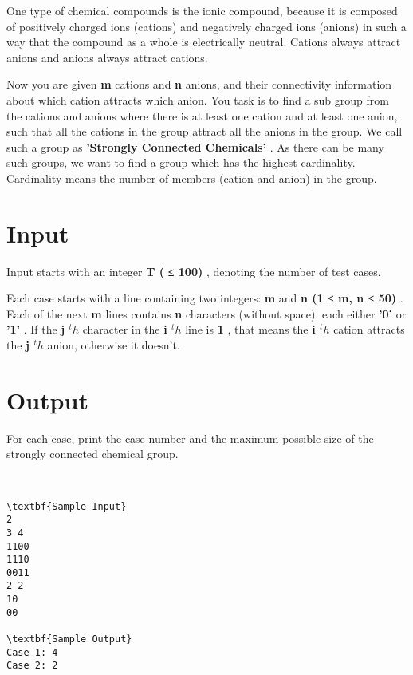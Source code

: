 

One type of chemical compounds is the ionic compound, because it is composed of positively charged ions (cations) and negatively charged ions (anions) in such a way that the compound as a whole is electrically neutral. Cations always attract anions and anions always attract cations.

Now you are given \textbf{ m } cations and \textbf{ n } anions, and their connectivity information about which cation attracts which anion. You task is to find a sub group from the cations and anions where there is at least one cation and at least one anion, such that all the cations in the group attract all the anions in the group. We call such a group as \textbf{ 'Strongly Connected Chemicals' } . As there can be many such groups, we want to find a group which has the highest cardinality. Cardinality means the number of members (cation and anion) in the group.

\section{Input}

Input starts with an integer \textbf{ T ( }\textbf{ ≤ 100) } , denoting the number of test cases.

Each case starts with a line containing two integers: \textbf{ m } and \textbf{ n (1 ≤ m, n ≤ 50) } . Each of the next \textbf{ m } lines contains \textbf{ n } characters (without space), each either \textbf{ '0' } or \textbf{ '1' } . If the \textbf{ j $^ th $} character in the \textbf{ i $^ th $} line is \textbf{ 1 } , that means the \textbf{ i $^ th $} cation attracts the \textbf{ j $^ th $} anion, otherwise it doesn't.

\section{Output}

For each case, print the case number and the maximum possible size of the strongly connected chemical group.

 
\begin{verbatim}
\textbf{Sample Input}
2
3 4
1100
1110
0011
2 2
10
00

\textbf{Sample Output}
Case 1: 4
Case 2: 2\end{verbatim}

 
